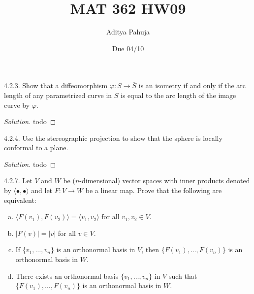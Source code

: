 \documentclass[10pt]{scrartcl}
\title{\vspace{-2em}MAT 362 HW09}
\author{\large Aditya Pahuja}
\date{\large Due 04/10}
\providecommand{\ol}{\overline}
\providecommand{\ii}{\item}
\newenvironment{soln}{\begin{proof}[Solution]}{\end{proof}}
\begin{document}
\maketitle

\begin{problem*}4.2.3.
	Show that a diffeomorphism $\varphi\colon S\to\ol S$
	is an isometry if and only if the arc length of
	any parametrized curve in $S$ is equal to the arc length
	of the image curve by $\varphi$.
\end{problem*}

\begin{soln}
	todo
\end{soln}

\begin{problem*}4.2.4.
	Use the stereographic projection to show that the sphere
	is locally conformal to a plane.
\end{problem*}

\begin{soln}
	todo
\end{soln}

\begin{problem*}4.2.7.
	Let $V$ and $W$ be ($n$-dimensional) vector spaces
	with inner products denoted by $\langle\bullet,\bullet\rangle$
	and let $F\colon V\to W$ be a linear map.
	Prove that the following are equivalent:
	\begin{enumerate}[(a)]
		\ii $\langle F(v_1), F(v_2)\rangle = \langle v_1,v_2\rangle$
		for all $v_1,v_2\in V$.
		\ii $|F(v)| = |v|$ for all $v\in V$.
		\ii If $\{v_1,\dots,v_n\}$ is an orthonormal basis in $V$,
		then $\{F(v_1),\dots,F(v_n)\}$ is an orthonormal basis in $W$.
		\ii There exists an orthonormal basis $\{v_1,\dots,v_n\}$ in $V$
		such that $\{F(v_1),\dots,F(v_n)\}$ is an orthonormal basis in $W$.
	\end{enumerate}
\end{problem*}
\end{document}
